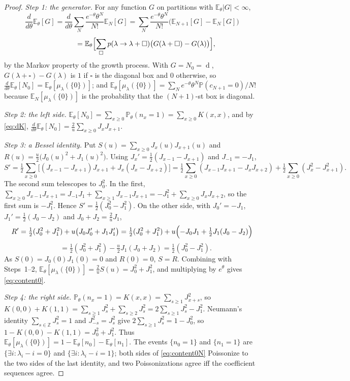 \documentclass[11pt]{article}
\theoremstyle{definition}
\theoremstyle{remark}
\newcommand{\Z}{\mathbb{Z}}
\newcommand{\E}{\mathbb{E}}
\newcommand{\Prob}{\mathbb{P}}
\DeclareMathOperator{\Durfee}{d}
\begin{document}
\begin{proof}
\emph{Step 1: the generator.} For any function $G$ on partitions with $\E_\theta|G|<\infty$,
\[
\frac{d}{d\theta}\E_\theta[G]=\frac{d}{d\theta}\sum_N\frac{e^{-\theta}\theta^N}{N!}\E_N[G]=\sum_N\frac{e^{-\theta}\theta^N}{N!}\bigl(\E_{N+1}[G]-\E_N[G]\bigr)
\]
\[
\phantom{\frac{d}{d\theta}\E_\theta[G]}=\E_\theta\Bigl[\sum_{\square}p(\lambda\to\lambda+\square)\bigl(G(\lambda+\square)-G(\lambda)\bigr)\Bigr],
\]
by the Markov property of the growth process. With $G=N_0=\Durfee$, $G(\lambda+\square)-G(\lambda)$ is $1$ if $\square$ is the diagonal box and $0$ otherwise, so $\frac{d}{d\theta}\E_\theta[N_0]=\E_\theta[\mu_\lambda(\{0\})]$; and $\E_\theta[\mu_\lambda(\{0\})]=\sum_Ne^{-\theta}\theta^N\Prob(c_{N+1}=0)/N!$ because $\E_N[\mu_\lambda(\{0\})]$ is the probability that the $(N+1)$-st box is diagonal.

\emph{Step 2: the left side.} $\E_\theta[N_0]=\sum_{x\ge0}\Prob_\theta(n_x=1)=\sum_{x\ge0}K(x,x)$, and by \eqref{eq:dK}, $\frac{d}{d\theta}\E_\theta[N_0]=\frac2u\sum_{x\ge0}J_xJ_{x+1}$.

\emph{Step 3: a Bessel identity.} Put $S(u)=\sum_{x\ge0}J_x(u)J_{x+1}(u)$ and $R(u)=\frac u2\bigl(J_0(u)^2+J_1(u)^2\bigr)$. Using $J_x'=\frac12(J_{x-1}-J_{x+1})$ and $J_{-1}=-J_1$,
\[
S'=\tfrac12\sum_{x\ge0}\bigl[(J_{x-1}-J_{x+1})J_{x+1}+J_x(J_x-J_{x+2})\bigr]
=\tfrac12\sum_{x\ge0}(J_{x-1}J_{x+1}-J_xJ_{x+2})+\tfrac12\sum_{x\ge0}(J_x^2-J_{x+1}^2).
\]
The second sum telescopes to $J_0^2$. In the first, $\sum_{x\ge0}J_{x-1}J_{x+1}=J_{-1}J_1+\sum_{x\ge1}J_{x-1}J_{x+1}=-J_1^2+\sum_{x\ge0}J_xJ_{x+2}$, so the first sum is $-J_1^2$. Hence $S'=\frac12(J_0^2-J_1^2)$. On the other side, with $J_0'=-J_1$, $J_1'=\frac12(J_0-J_2)$ and $J_0+J_2=\frac2uJ_1$,
\[
R'=\tfrac12(J_0^2+J_1^2)+u\bigl(J_0J_0'+J_1J_1'\bigr)=\tfrac12(J_0^2+J_1^2)+u\Bigl(-J_0J_1+\tfrac12J_1(J_0-J_2)\Bigr)
\]
\[
\phantom{R'}=\tfrac12(J_0^2+J_1^2)-\tfrac u2J_1(J_0+J_2)=\tfrac12(J_0^2-J_1^2).
\]
As $S(0)=J_0(0)J_1(0)=0$ and $R(0)=0$, $S=R$. Combining with Steps~1--2, $\E_\theta[\mu_\lambda(\{0\})]=\frac2uS(u)=J_0^2+J_1^2$, and multiplying by $e^\theta$ gives \eqref{eq:content0}.

\emph{Step 4: the right side.} $\Prob_\theta(n_x=1)=K(x,x)=\sum_{s\ge1}J_{x+s}^2$, so $K(0,0)+K(1,1)=\sum_{s\ge1}J_s^2+\sum_{s\ge2}J_s^2=2\sum_{s\ge1}J_s^2-J_1^2$. Neumann's identity $\sum_{s\in\Z}J_s^2=1$ and $J_{-s}^2=J_s^2$ give $2\sum_{s\ge1}J_s^2=1-J_0^2$, so $1-K(0,0)-K(1,1)=J_0^2+J_1^2$. Thus $\E_\theta[\mu_\lambda(\{0\})]=1-\E_\theta[n_0]-\E_\theta[n_1]$. The events $\{n_0=1\}$ and $\{n_1=1\}$ are $\{\exists i:\lambda_i-i=0\}$ and $\{\exists i:\lambda_i-i=1\}$; both sides of \eqref{eq:content0N} Poissonize to the two sides of the last identity, and two Poissonizations agree iff the coefficient sequences agree.
\end{proof}
\end{document}
